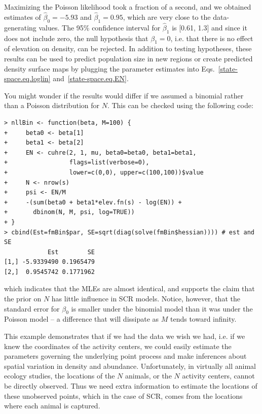 Maximizing the Poisson likelihood took a fraction of a second, and we
obtained estimates of $\hat{\beta}_0=-5.93$ and $\hat{\beta}_1=0.95$,
which are very close to the data-generating values. The 95\% confidence
interval for $\hat{\beta}_1$ is [0.61, 1.3] and since it does not
include zero, the null hypothesis that $\beta_1=0$, i.e. that there is
no effect of elevation on density, can be rejected. In addition to testing
hypotheses, these results can be used to predict population size in
new regions or create predicted density surface maps by plugging the
parameter estimates into Eqs.~\ref{state-space.eq.loglin} and~\ref{state-space.eq.EN}.

You might wonder if the results would differ if we assumed a binomial
rather than a Poisson distribution for $N$. This can be checked
using the following code:
\begin{small}
\begin{verbatim}
> nllBin <- function(beta, M=100) {
+     beta0 <- beta[1]
+     beta1 <- beta[2]
+     EN <- cuhre(2, 1, mu, beta0=beta0, beta1=beta1,
+                 flags=list(verbose=0),
+                 lower=c(0,0), upper=c(100,100))$value
+     N <- nrow(s)
+     psi <- EN/M
+     -(sum(beta0 + beta1*elev.fn(s) - log(EN)) +
+       dbinom(N, M, psi, log=TRUE))
+ }
> cbind(Est=fmBin$par, SE=sqrt(diag(solve(fmBin$hessian)))) # est and SE
            Est        SE
[1,] -5.9339490 0.1965479
[2,]  0.9545742 0.1771962
\end{verbatim}
\end{small}
which indicates that the MLEs are almost identical, and
supports the claim that the prior
on $N$ has little influence in SCR models. Notice, however, that the
standard error for $\beta_0$ is smaller under the binomial model than
it was under the Poisson model -- a difference that will dissipate as
$M$ tends toward infinity.

This example demonstrates
that if we had the data we wish we had, i.e. if we knew the
coordinates of the activity centers, we could easily estimate the
parameters governing the underlying point process and make inferences
about spatial variation in density and abundance. Unfortunately, in
virtually all animal ecology studies,
the locations of the $N$ animals, or the $N$ activity centers,
cannot be directly observed. Thus we need
extra information to estimate the locations of these unobserved
points, which in the case of SCR, comes from the locations where each
animal is captured.


